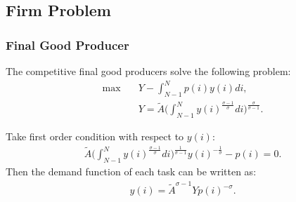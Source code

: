 \documentclass[12pt]{article}
\begin{document}
\clearpage


\clearpage

\begin{appendices}

\section{Firm Problem}

\subsubsection*{Final Good Producer}
The competitive final good producers solve the following problem:
\begin{align*}
\max \quad & Y-\int_{N-1}^Np(i)y(i)di, \\
&Y = \tilde{A}\Big(\int_{N-1}^{N}y(i)^{\frac{\sigma-1}{\sigma}}di\Big)^{\frac{\sigma}{\sigma-1}}.
\end{align*}

Take first order condition with respect to $y(i)$:
\begin{align*}
\tilde{A}\Big(\int_{N-1}^{N}y(i)^{\frac{\sigma-1}{\sigma}}di\Big)^{\frac{1}{\sigma-1}}y(i)^{-\frac{1}{\sigma}}-p(i) = 0.
\end{align*}
Then the demand function of each task can be written as:
\begin{align*}
y(i) = \tilde{A}^{\sigma-1}Yp(i)^{-\sigma}.
\end{align*}


\end{appendices}
\end{document}
